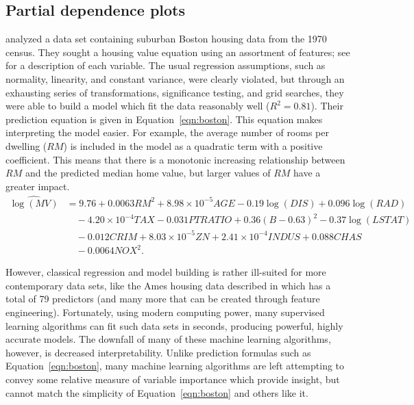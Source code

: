 \documentclass[12pt]{article}
\begin{document}
\subsection{Partial dependence plots}

\citet{harrison-1978-hedonic} analyzed a data set containing suburban Boston housing data from the 1970 census. They sought a housing value equation using an assortment of features; see \citet[Table IV]{harrison-1978-hedonic} for a description of each variable. The usual regression assumptions, such as normality, linearity, and constant variance, were clearly violated, but through an exhausting series of transformations, significance testing, and grid searches, they were able to build a model which fit the data reasonably well ($R^2 = 0.81$). Their prediction equation is given in Equation~\eqref{eqn:boston}. This equation makes interpreting the model easier. For example, the average number of rooms per dwelling ($RM$) is included in the model as a quadratic term with a positive coefficient. This means that there is a monotonic increasing relationship between $RM$ and the predicted median home value, but larger values of $RM$ have a greater impact.
\begin{equation}
\label{eqn:boston}
\begin{aligned}
\widehat{\log\left(MV\right)} &= 9.76 + 0.0063 RM^2 + 8.98\times10^{-5} AGE - 0.19\log\left(DIS\right) + 0.096\log\left(RAD\right) \\
  & \quad - 4.20\times10^{-4} TAX - 0.031 PTRATIO + 0.36\left(B - 0.63\right)^2 - 0.37\log\left(LSTAT\right) \\
  & \quad - 0.012 CRIM + 8.03\times10^{-5} ZN + 2.41\times10^{-4} INDUS + 0.088 CHAS \\
  & \quad - 0.0064 NOX^2.
\end{aligned}
\end{equation}

However, classical regression and model building is rather ill-suited for more contemporary data sets, like the Ames housing data described in \citet{ames-cock-2011} which has a total of 79 predictors (and many more that can be created through feature engineering). Fortunately, using modern computing power, many supervised learning algorithms can fit such data sets in seconds, producing powerful, highly accurate models. The downfall of many of these machine learning algorithms, however, is decreased interpretability. Unlike prediction formulas such as Equation~\eqref{eqn:boston}, many machine learning algorithms are left attempting to convey some relative measure of variable importance which provide insight, but cannot match the simplicity of Equation~\eqref{eqn:boston} and others like it.
\end{document}
